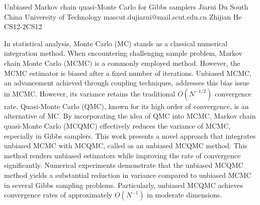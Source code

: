 \begin{talk}
  {Unbiased Markov chain quasi-Monte Carlo for Gibbs samplers}%
  {Jiarui Du}%
  {South China University of Technology}%
  {mascut.dujiarui@mail.scut.edu.cn}%
  {Zhijian He}%
{}{}{CS12-2}{CS12}

			
In statistical analysis, Monte Carlo (MC) stands as a classical numerical integration method. When encountering challenging sample problem, Markov chain Monte Carlo (MCMC) is a commonly employed method. However, the MCMC estimator is biased after a fixed number of iterations. Unbiased MCMC, an advancement achieved through coupling techniques, addresses this bias issue in MCMC. However, its variance retains the traditional $O(N^{-1/2})$ convergence rate. Quasi-Monte Carlo (QMC), known for its high order of convergence, is an alternative of MC. By incorporating the idea of QMC into MCMC, Markov chain quasi-Monte Carlo (MCQMC) effectively reduces the variance of MCMC, especially in Gibbs samplers. This work presents a novel approach that integrates unbiased MCMC with MCQMC, called as an unbiased MCQMC method. This method renders unbiased estimators while improving the rate of convergence
significantly. Numerical experiments demonstrate that the unbiased MCQMC method yields a substantial reduction in variance compared to unbiased MCMC in several Gibbs sampling problems. Particularly, unbiased MCQMC achieves convergence rates of approximately $O(N^{-1})$ in moderate dimensions.

\medskip

\end{talk}


